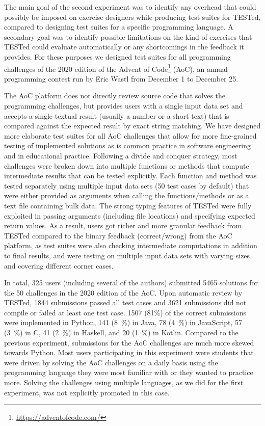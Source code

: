 \documentclass[../main]{subfiles}
\begin{document}
The main goal of the second experiment was to identify any overhead that could possibly be imposed on exercise designers while producing test suites for TESTed, compared to designing test suites for a specific programming language.
A secondary goal was to identify possible limitations on the kind of exercises that TESTed could evaluate automatically or any shortcomings in the feedback it provides.
For these purposes we designed test suites for all programming challenges of the 2020 edition of the Advent of Code\footnote{\url{https://adventofcode.com/}} (AoC), an annual programming contest run by Eric Wastl from December 1 to December 25.

The AoC platform does not directly review source code that solves the programming challenges, but provides users with a single input data set and accepts a single textual result (usually a number or a short text) that is compared against the expected result by exact string matching.
We have designed more elaborate test suites for all AoC challenges that allow for more fine-grained testing of implemented solutions as is common practice in software engineering and in educational practice.
Following a divide and conquer strategy, most challenges were broken down into multiple functions or methods that compute intermediate results that can be tested explicitly.
Each function and method was tested separately using multiple input data sets (50 test cases by default) that were either provided as arguments when calling the functions/methods or as a text file containing bulk data.
The strong typing features of TESTed were fully exploited in passing arguments (including file locations) and specifying expected return values.
As a result, users got richer and more granular feedback from TESTed compared to the binary feedback (correct/wrong) from the AoC platform, as test suites were also checking intermediate computations in addition to final results, and were testing on multiple input data sets with varying sizes and covering different corner cases.

In total, \num{325} users (including several of the authors) submitted \num{5465} solutions for the \num{50} challenges in the 2020 edition of the AoC. Upon automatic review by TESTed, \num{1844} submissions passed all test cases and \num{3621} submissions did not compile or failed at least one test case.
\num{1507} (81\%) of the correct submissions were implemented in Python, \num{141} (\qty{8}{\percent}) in Java, \num{78} (\qty{4}{\percent}) in JavaScript, \num{57} (\qty{3}{\percent}) in C, \num{41} (\qty{2}{\percent}) in Haskell, and \num{20} (\qty{1}{\percent}) in Kotlin.
Compared to the previous experiment, submissions for the AoC challenges are much more skewed towards Python.
Most users participating in this experiment were students that were driven by solving the AoC challenges on a daily basis using the programming language they were most familiar with or they wanted to practice more.
Solving the challenges using multiple languages, as we did for the first experiment, was not explicitly promoted in this case.
\end{document}

